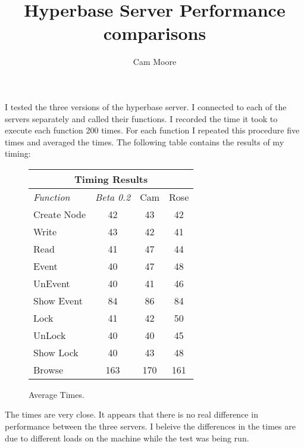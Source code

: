 



\title{Hyperbase Server Performance comparisons} \author{Cam Moore}

\maketitle

I tested the three versions of the hyperbase server.  I connected to each
of the servers separately and called their functions.  I recorded the time
it took to execute each function 200 times.  For each function I repeated
this procedure five times and averaged the times.  The following table
contains the results of my timing:

\small

             \begin{figure}[htpb]
             \begin{center}
             \begin{tabular} {|l|c|c|c|} \hline
             \multicolumn{4}{|c|}{{\bf Timing Results}} \\  \hline
{\em Function} & {\em Beta 0.2} & {Cam} & {Rose}\\ \hline
Create Node & 42 & 43 & 42  \\
\hline
Write & 43 & 42 & 41 \\
\hline
Read & 41 & 47 & 44 \\
\hline
Event & 40 & 47 & 48 \\
\hline
UnEvent & 40 & 41 & 46 \\
\hline
Show Event & 84 & 86 & 84 \\
\hline
Lock & 41 & 42 & 50 \\
\hline
UnLock & 40 & 40 & 45 \\
\hline
Show Lock & 40 & 43 & 48 \\
\hline
Browse & 163 & 170 & 161\\
\hline
\end{tabular}
             \end{center}
             \caption{Average Times. }
             \end{figure}
             \normalsize
The times are very close.  It appears that there is no real difference in
performance between the three servers.  I beleive the differences in the
times are due to different loads on the machine while the test was being run.






